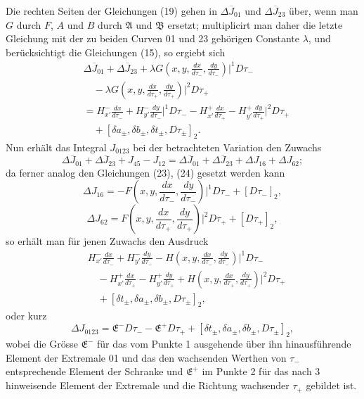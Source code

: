 \documentclass[11pt,a4paper,leqno]{article}
\begin{document}
Die rechten Seiten der Gleichungen (19) gehen in $\Delta\overline J_{01}$ und $\Delta\overline J_{23}$ über, wenn man $G$ durch $F$, $A$ und $B$ durch $\mathfrak A$ und $\mathfrak B$ ersetzt; multiplicirt man daher die letzte Gleichung mit der zu beiden Curven 01 und 23 gehörigen Constante $\lambda$, und berücksichtigt die Gleichungen (15), so ergiebt sich
\[
\begin{aligned}
&\Delta\overline J_{01}+\Delta\overline J_{23}
+\lambda G\left(x,y,\frac{dx}{d\tau_-},\frac{dy}{d\tau_-}\right)\bigg|^1D\tau_-\\
&\quad -\lambda G\left(x,y,\frac{dx}{d\tau_+},\frac{dy}{d\tau_+}\right)\bigg|^2D\tau_+\\
&=H_{x'}^-\frac{dx}{d\tau_-}+H_{y'}^-\frac{dy}{d\tau_-}\bigg|^1D\tau_-
-H_{x'}^+\frac{dx}{d\tau_+}-H_{y'}^+\frac{dy}{d\tau_+}\bigg|^2D\tau_+\\
&\quad +[\delta a_\pm,\delta b_\pm,\delta t_\pm,D\tau_\pm]_2.
\end{aligned}
\]
Nun erhält das Integral $J_{0123}$ bei der betrachteten Variation den Zuwachs
\[
\Delta\overline J_{01}+\Delta\overline J_{23}+J_{45}-J_{12}
=\Delta\overline J_{01}+\Delta\overline J_{23}+\Delta J_{16}+\Delta J_{62};
\]
da ferner analog den Gleichungen (23), (24) gesetzt werden kann
\[
\Delta J_{16}=-F\left(x,y,\frac{dx}{d\tau_-},\frac{dy}{d\tau_-}\right)\bigg|^1D\tau_-+[D\tau_-]_2,
\]
\[
\Delta J_{62}=F\left(x,y,\frac{dx}{d\tau_+},\frac{dy}{d\tau_+}\right)\bigg|^2D\tau_+ +[D\tau_+]_2,
\]
so erhält man für jenen Zuwachs den Ausdruck
\[
\begin{aligned}
&H_{x'}^-\frac{dx}{d\tau_-}+H_{y'}^-\frac{dy}{d\tau_-}
-H\left(x,y,\frac{dx}{d\tau_-},\frac{dy}{d\tau_-}\right)\bigg|^1D\tau_-\\
&\quad -H_{x'}^+\frac{dx}{d\tau_+}-H_{y'}^+\frac{dy}{d\tau_+}
+H\left(x,y,\frac{dx}{d\tau_+},\frac{dy}{d\tau_+}\right)\bigg|^2D\tau_+\\
&\quad +[\delta t_\pm,\delta a_\pm,\delta b_\pm,D\tau_\pm]_2,
\end{aligned}
\]
oder kurz
\[
\Delta J_{0123}=\mathfrak E^-D\tau_- -\mathfrak E^+D\tau_+ +[\delta t_\pm,\delta a_\pm,\delta b_\pm,D\tau_\pm]_2,
\]
wobei die Grösse $\mathfrak E^-$ für das vom Punkte 1 ausgehende über ihn hinausführende Element der Extremale 01 und das den wachsenden Werthen von $\tau_-$ entsprechende Element der Schranke und $\mathfrak E^+$ im Punkte 2 für das nach 3 hinweisende Element der Extremale und die Richtung wachsender $\tau_+$ gebildet ist.
\end{document}
